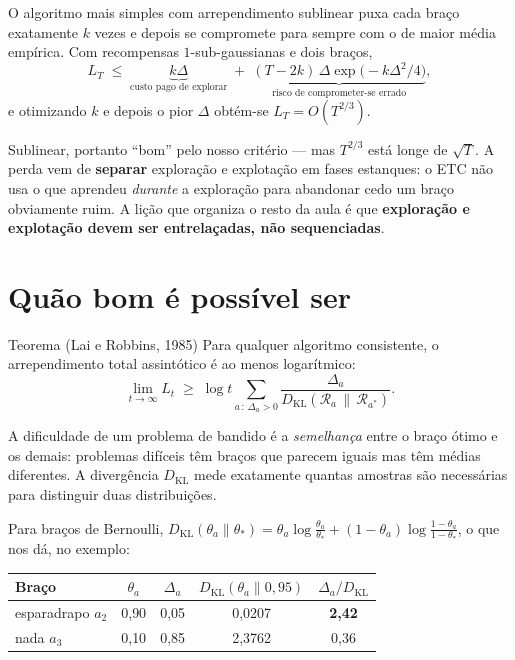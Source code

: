 \documentclass[11pt, a4paper]{article}
\newcommand{\gap}{\Delta}
\newcommand{\KL}{D_{\mathrm{KL}}}
\newcommand{\Reg}{L}
\begin{document}
O algoritmo mais simples com arrependimento sublinear puxa cada braço
exatamente $k$ vezes e depois se compromete para sempre com o de maior média
empírica. Com recompensas $1$-sub-gaussianas e dois braços,
\[
  \Reg_T \;\le\; \underbrace{k\gap}_{\text{custo pago de explorar}}
    \;+\; \underbrace{(T-2k)\,\gap\exp\bigl(-k\gap^2/4\bigr)}_{\text{risco de comprometer-se errado}},
\]
e otimizando $k$ e depois o pior $\gap$ obtém-se $\Reg_T = O(T^{2/3})$.

Sublinear, portanto ``bom'' pelo nosso critério — mas $T^{2/3}$ está longe de
$\sqrt{T}$. A perda vem de \textbf{separar} exploração e explotação em fases
estanques: o ETC não usa o que aprendeu \emph{durante} a exploração para
abandonar cedo um braço obviamente ruim. A lição que organiza o resto da
aula é que \textbf{exploração e explotação devem ser entrelaçadas, não
sequenciadas}.

\section{Quão bom é possível ser}

\begin{teobox}{Teorema (Lai e Robbins, 1985)}
Para qualquer algoritmo consistente, o arrependimento total assintótico é ao
menos logarítmico:
\[
  \lim_{t\to\infty} \Reg_t \;\ge\; \log t
    \sum_{a\,:\,\gap_a>0} \frac{\gap_a}{\KL(\mathcal{R}_a \,\|\, \mathcal{R}_{a^{*}})}.
\]
\end{teobox}

A dificuldade de um problema de bandido é a \emph{semelhança} entre o braço
ótimo e os demais: problemas difíceis têm braços que parecem iguais mas têm
médias diferentes. A divergência $\KL$ mede exatamente quantas amostras são
necessárias para distinguir duas distribuições.

Para braços de Bernoulli,
$\KL(\theta_a \| \theta_{*}) = \theta_a\log\frac{\theta_a}{\theta_{*}}
 + (1-\theta_a)\log\frac{1-\theta_a}{1-\theta_{*}}$, o que nos dá, no
exemplo:

\begin{center}
\begin{tabular}{lcccc}
\toprule
\textbf{Braço} & $\theta_a$ & $\gap_a$ & $\KL(\theta_a \| 0{,}95)$
  & $\gap_a/\KL$ \\
\midrule
esparadrapo $a_2$ & 0{,}90 & 0{,}05 & 0{,}0207 & \textbf{2{,}42} \\
nada $a_3$        & 0{,}10 & 0{,}85 & 2{,}3762 & 0{,}36 \\
\bottomrule
\end{tabular}
\end{center}
\end{document}
